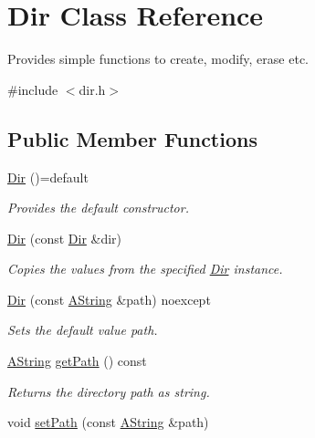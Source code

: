 \hypertarget{class_dir}{}\section{Dir Class Reference}
\label{class_dir}


Provides simple functions to create, modify, erase etc.  




{\ttfamily \#include $<$dir.\+h$>$}

\subsection*{Public Member Functions}
\begin{DoxyCompactItemize}
\item 
\mbox{\label{class_dir_a980b2eede48ad286e81ac910871985ad}} 
\mbox{\hyperlink{class_dir_a980b2eede48ad286e81ac910871985ad}{Dir}} ()=default
\begin{DoxyCompactList}\small\item\em Provides the default constructor. \end{DoxyCompactList}\item 
\mbox{\hyperlink{class_dir_a11b1a16ab3197a15c3807df0e09fce4e}{Dir}} (const \mbox{\hyperlink{class_dir}{Dir}} \&dir)
\begin{DoxyCompactList}\small\item\em Copies the values from the specified \mbox{\hyperlink{class_dir}{Dir}} instance. \end{DoxyCompactList}\item 
\mbox{\hyperlink{class_dir_af683b1177318b82b880e21356750a6e0}{Dir}} (const \mbox{\hyperlink{class_a_string}{A\+String}} \&path) noexcept
\begin{DoxyCompactList}\small\item\em Sets the default value path. \end{DoxyCompactList}\item 
\mbox{\hyperlink{class_a_string}{A\+String}} \mbox{\hyperlink{class_dir_a000627e9787773619bccc3d4ef76a7ac}{get\+Path}} () const
\begin{DoxyCompactList}\small\item\em Returns the directory path as string. \end{DoxyCompactList}\item 
void \mbox{\hyperlink{class_dir_a08bb155c0d0ae5150997dedce31aa56f}{set\+Path}} (const \mbox{\hyperlink{class_a_string}{A\+String}} \&path)

\end{DoxyCompactItemize}
